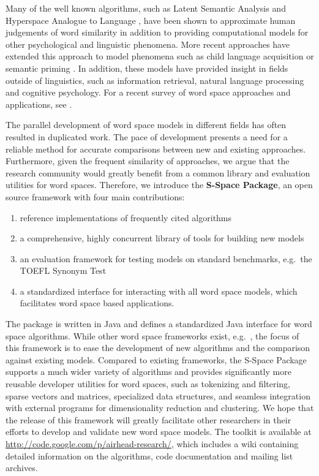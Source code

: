Many of the well known algorithms, such as Latent Semantic Analysis
\cite{landauer97solution} and Hyperspace Analogue to Language
\cite{burgess97modeling}, have been shown to approximate human judgements of
word similarity in addition to providing computational models for other
psychological and linguistic phenomena.  More recent approaches have extended
this approach to model phenomena such as child language acquisition
\cite{baroni07isa} or semantic priming \cite{jones06high}.  In addition, these
models have provided insight in fields outside of linguistics, such as
information retrieval, natural language processing and cognitive psychology.
For a recent survey of word space approaches and applications, see
\cite{turney10frequency}.

The parallel development of word space models in different fields has often
resulted in duplicated work.  The pace of development presents a need for a
reliable method for accurate comparisons between new and existing approaches.
Furthermore, given the frequent similarity of approaches, we argue that the
research community would greatly benefit from a common library and evaluation
utilities for word spaces.  Therefore, we introduce the \textbf{S-Space
  Package}, an open source framework with four main contributions:
%
\begin{enumerate}
  \setlength{\itemsep}{1pt}
  \setlength{\parskip}{0pt}
  \setlength{\parsep}{0pt}
  \item reference implementations of frequently cited algorithms
  \item a comprehensive, highly concurrent library of tools for building new
    models
  \item an evaluation framework for testing models on standard benchmarks,
    e.g.\ the TOEFL Synonym Test \cite{landauer98introduction}
  \item a standardized interface for interacting with all word space models,
    which facilitates word space based applications.
\end{enumerate}

The package is written in Java and defines a standardized Java interface for word
space algorithms.  
%
While other word space frameworks exist, e.g.\ \cite{widdows08semantic}, the
focus of this framework is to ease the development of new algorithms and the
comparison against existing models.
%
Compared to existing frameworks, the S-Space Package supports a much wider
variety of algorithms and provides significantly more reusable developer
utilities for word spaces, such as tokenizing and filtering, sparse vectors and
matrices, specialized data structures, and seamless integration with external
programs for dimensionality reduction and clustering.
%
We hope that the release of this framework will greatly facilitate other
researchers in their efforts to develop and validate new word space models.  The
toolkit is available at {\small
  \url{http://code.google.com/p/airhead-research/}}, which includes a wiki
containing detailed information on the algorithms, code documentation and
mailing list archives.

